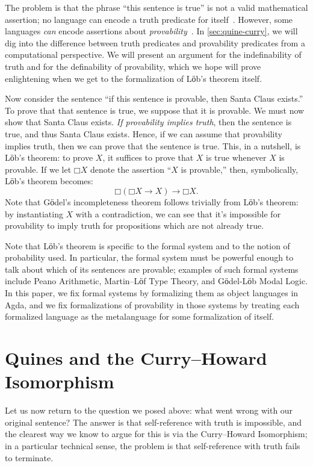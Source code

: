  The problem is that the phrase ``this sentence is true'' is not a
 valid mathematical assertion; no language can encode a truth
 predicate for itself~\cite{tarski1936undefinability}.  However, some
 languages \emph{can} encode assertions about
 \emph{provability}~\cite{godel1931formal}.  In
 \autoref{sec:quine-curry}, we will dig into the difference between
 truth predicates and provability predicates from a computational
 perspective.  We will present an argument for the indefinability of
 truth and for the definability of provability, which we hope will
 prove enlightening when we get to the formalization of Lӧb's theorem
 itself.

 Now consider the sentence ``if this sentence is provable, then Santa
 Claus exists.''  To prove that that sentence is true, we suppose that
 it is provable.  We must now show that Santa Claus exists.  \emph{If
 provability implies truth}, then the sentence is true, and thus Santa
 Claus exists.  Hence, if we can assume that provability implies
 truth, then we can prove that the sentence is true.  This, in a
 nutshell, is Lӧb's theorem: to prove $X$, it suffices to prove that
 $X$ is true whenever $X$ is provable.  If we let $□ X$ denote the
 assertion ``$X$ is provable,'' then, symbolically, Lӧb's theorem
 becomes: $$□ (□ X → X) → □ X.$$ Note that Gӧdel's incompleteness
 theorem follows trivially from Lӧb's theorem: by instantiating $X$
 with a contradiction, we can see that it's impossible for provability
 to imply truth for propositions which are not already true.

 Note that Lӧb's theorem is specific to the formal system and to the
 notion of probability used.  In particular, the formal system must be
 powerful enough to talk about which of its sentences are provable;
 examples of such formal systems include Peano Arithmetic, Martin--Lӧf
 Type Theory, and Gӧdel-Lӧb Modal Logic.  In this paper, we fix formal
 systems by formalizing them as object languages in Agda, and we fix
 formalizations of provability in those systems by treating each
 formalized language as the metalanguage for some formalization of
 itself.

\section{Quines and the Curry--Howard Isomorphism} \label{sec:quine-curry}

 Let us now return to the question we posed above: what went wrong
 with our original sentence?  The answer is that self-reference with
 truth is impossible, and the clearest way we know to argue for this is
 via the Curry--Howard Isomorphism; in a particular technical sense,
 the problem is that self-reference with truth fails to terminate.

